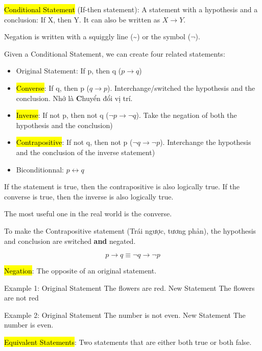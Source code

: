 \hl{Conditional Statement} (If-then statement): A statement with a hypothesis and a conclusion: If X, then Y. It can also be written as $X \rightarrow Y$.

Negation is written with a squiggly line (\textasciitilde) or the symbol ($\neg$).

Given a Conditional Statement, we can create four related statements:

\begin{itemize}
  \item Original Statement: If p, then q ($p \rightarrow q$)
  \item \hl{Converse}: If q, then p ($q \rightarrow p$). Interchange/switched the hypothesis and the conclusion. Nhớ  là \textbf{C}huyển đổi vị trí.
  \item \hl{Inverse}: If not p, then not q ($\neg p \rightarrow \neg q$). Take the negation of both the hypothesis and the conclusion)
  \item \hl{Contrapositive}: If not q, then not p ($\neg q \rightarrow \neg p$). Interchange the hypothesis and the conclusion of the inverse statement)
  \item Biconditionnal: $p \longleftrightarrow q$
\end{itemize}

If the statement is true, then the contrapositive is also logically true. If the converse is true, then the inverse is also logically true.

The most useful one in the real world is the converse.

\vspace{0.5cm}

To make the Contrapositive statement (Trái ngược, tương phản), the hypothesis and conclusion are switched \textbf{and} negated.

\[p \rightarrow q \equiv \neg q \rightarrow \neg p\]

\vspace{0.5cm}

\hl{Negation}: The opposite of an original statement.

Example 1: Original Statement The flowers are red. New Statement The flowers are not red

Example 2: Original Statement The number is not even. New Statement The number is even.

\vspace{.6cm}

\hl{Equivalent Statements}: Two statements that are either both true or both false.

